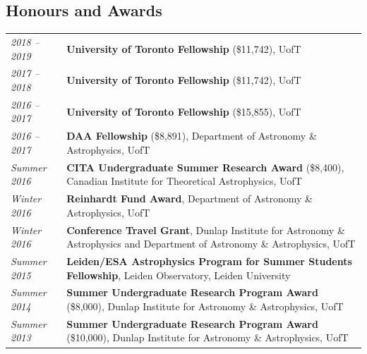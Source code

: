 \documentclass[10pt]{res} %
\begin{document}
\begin{resume}
\section{\Large Honours and Awards}
\vspace{-5pt} %
\noindent\makebox[\linewidth]{\rule{\textwidth}{0.4pt}}
\vspace{-20pt} %

\begin{table}[h]
\begin{tabularx}{\textwidth}{lX}
\textit{2018 -- 2019} & \textbf{University of Toronto Fellowship} (\$11,742), UofT \\
\textit{2017 -- 2018} & \textbf{University of Toronto Fellowship} (\$11,742), UofT \\
\textit{2016 -- 2017} & \textbf{University of Toronto Fellowship} (\$15,855), UofT \\
\textit{2016 -- 2017} & \textbf{DAA Fellowship} (\$8,891), Department of Astronomy \& Astrophysics, UofT \\
\textit{Summer 2016} & \textbf{CITA Undergraduate Summer Research Award} (\$8,400), Canadian Institute for Theoretical Astrophysics, UofT \\
\textit{Winter 2016} & \textbf{Reinhardt Fund Award}, Department of Astronomy \& Astrophysics, UofT \\
\textit{Winter 2016} & \textbf{Conference Travel Grant}, Dunlap Institute for Astronomy \& Astrophysics and Department of Astronomy \& Astrophysics, UofT \\
\textit{Summer 2015} & \textbf{Leiden/ESA Astrophysics Program for Summer Students Fellowship}, Leiden Observatory, Leiden University \\
\textit{Summer 2014} & \textbf{Summer Undergraduate Research Program Award} (\$8,000), Dunlap Institute for Astronomy \& Astrophysics, UofT \\
\textit{Summer 2013} & \textbf{Summer Undergraduate Research Program Award} (\$10,000), Dunlap Institute for Astronomy \& Astrophysics, UofT 
\end{tabularx}
\end{table}



\end{resume}
\end{document}
